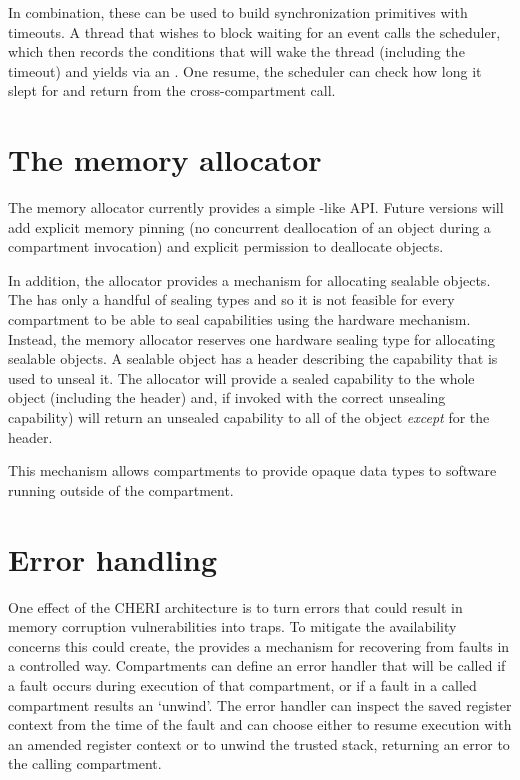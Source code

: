 In combination, these can be used to build synchronization primitives with timeouts.
A thread that wishes to block waiting for an event calls the scheduler, which then records the conditions that will wake the thread (including the timeout) and yields via an .
One resume, the scheduler can check how long it slept for and return from the cross-compartment call.

\section{The memory allocator}

The memory allocator currently provides a simple -like API.
Future versions will add explicit memory pinning (no concurrent deallocation of an object during a compartment invocation) and explicit permission to deallocate objects.

In addition, the allocator provides a mechanism for allocating sealable objects.
The \cherimcuisa{} has only a handful of sealing types and so it is not feasible for every compartment to be able to seal capabilities using the hardware mechanism.
Instead, the memory allocator reserves one hardware sealing type for allocating sealable objects.
A sealable object has a header describing the capability that is used to unseal it.
The allocator will provide a sealed capability to the whole object (including the header) and, if invoked with the correct unsealing capability) will return an unsealed capability to all of the object \textit{except} for the header.

This mechanism allows compartments to provide opaque data types to software running outside of the compartment.

\section{Error handling}
\label{sec:errorhandling}
One effect of the CHERI architecture is to turn errors that could result in memory corruption vulnerabilities into traps.
To mitigate the availability concerns this could create, the \cherimcuos{} provides a mechanism for recovering from faults in a controlled way.
Compartments can define an error handler that will be called if a fault occurs during execution of that compartment, or if a fault in a called compartment results an `unwind'.
The error handler can inspect the saved register context from the time of the fault and can choose either to resume execution with an amended register context or to unwind the trusted stack, returning an error to the calling compartment.


